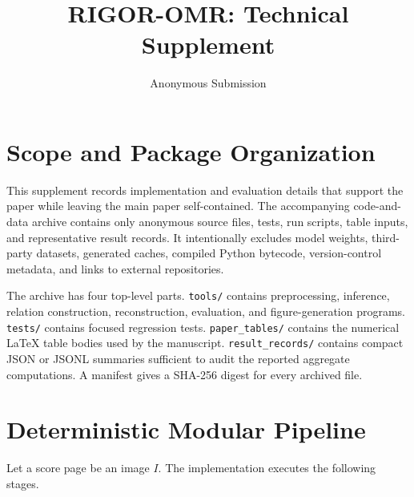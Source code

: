 \documentclass[letterpaper]{article}
\title{RIGOR-OMR: Technical Supplement}
\author{Anonymous Submission}
\begin{document}
\maketitle

\section{Scope and Package Organization}
This supplement records implementation and evaluation details that support the paper while leaving the main paper self-contained. The accompanying code-and-data archive contains only anonymous source files, tests, run scripts, table inputs, and representative result records. It intentionally excludes model weights, third-party datasets, generated caches, compiled Python bytecode, version-control metadata, and links to external repositories.

The archive has four top-level parts. \texttt{tools/} contains preprocessing, inference, relation construction, reconstruction, evaluation, and figure-generation programs. \texttt{tests/} contains focused regression tests. \texttt{paper\_tables/} contains the numerical LaTeX table bodies used by the manuscript. \texttt{result\_records/} contains compact JSON or JSONL summaries sufficient to audit the reported aggregate computations. A manifest gives a SHA-256 digest for every archived file.

\section{Deterministic Modular Pipeline}
Let a score page be an image $I$. The implementation executes the following stages.
\end{document}
